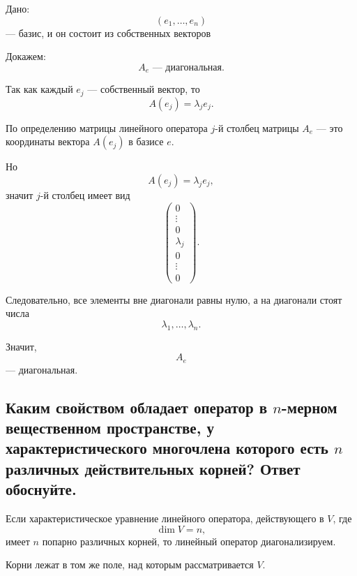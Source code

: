 \begin{Proof}
    Дано:
    \[
        (e_1,\ldots,e_n)
    \]
    --- базис, и он состоит из собственных векторов

    Докажем:
    \[
        A_e \text{ --- диагональная.}
    \]

    Так как каждый $e_j$ --- собственный вектор, то
    \[
        A(e_j)=\lambda_j e_j.
    \]

    По определению матрицы линейного оператора $j$-й столбец матрицы $A_e$ --- это координаты вектора $A(e_j)$ в базисе $e$.

    Но
    \[
        A(e_j)=\lambda_j e_j,
    \]
    значит $j$-й столбец имеет вид
    \[
        \begin{pmatrix}
            0 \\
            \vdots \\
            0 \\
            \lambda_j \\
            0 \\
            \vdots \\
            0
        \end{pmatrix}.
    \]

    Следовательно, все элементы вне диагонали равны нулю, а на диагонали стоят числа
    \[
        \lambda_1,\ldots,\lambda_n.
    \]

    Значит,
    \[
        A_e
    \]
    --- диагональная.
\end{Proof}
\subsection{Каким свойством обладает оператор в $n$-мерном вещественном пространстве, у характеристического многочлена которого есть $n$ различных действительных корней? Ответ обоснуйте.}

\begin{theorem}
    Если характеристическое уравнение линейного оператора, действующего в $V$, где
    \[
        \dim V = n,
    \]
    имеет $n$ попарно различных корней, то линейный оператор диагонализируем.
    
    Корни лежат в том же поле, над которым рассматривается $V$.
\end{theorem}

